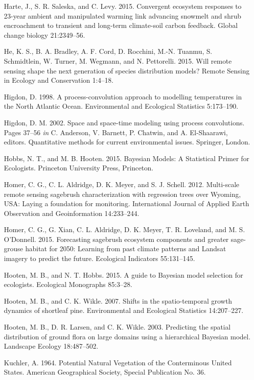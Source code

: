 \documentclass[12pt,]{article}
\begin{document}
Harte, J., S. R. Saleska, and C. Levy. 2015. Convergent ecosystem
responses to 23-year ambient and manipulated warming link advancing
snowmelt and shrub encroachment to transient and long-term climate-soil
carbon feedback. Global change biology 21:2349--56.

He, K. S., B. A. Bradley, A. F. Cord, D. Rocchini, M.-N. Tuanmu, S.
Schmidtlein, W. Turner, M. Wegmann, and N. Pettorelli. 2015. Will remote
sensing shape the next generation of species distribution models? Remote
Sensing in Ecology and Conservation 1:4--18.

Higdon, D. 1998. A process-convolution approach to modelling
temperatures in the North Atlantic Ocean. Environmental and Ecological
Statistics 5:173--190.

Higdon, D. M. 2002. Space and space-time modeling using process
convolutions. Pages 37--56 \emph{in} C. Anderson, V. Barnett, P.
Chatwin, and A. El-Shaarawi, editors. Quantitative methods for current
environmental issues. Springer, London.

Hobbs, N. T., and M. B. Hooten. 2015. Bayesian Models: A Statistical
Primer for Ecologists. Princeton University Press, Princeton.

Homer, C. G., C. L. Aldridge, D. K. Meyer, and S. J. Schell. 2012.
Multi-scale remote sensing sagebrush characterization with regression
trees over Wyoming, USA: Laying a foundation for monitoring.
International Journal of Applied Earth Observation and Geoinformation
14:233--244.

Homer, C. G., G. Xian, C. L. Aldridge, D. K. Meyer, T. R. Loveland, and
M. S. O'Donnell. 2015. Forecasting sagebrush ecosystem components and
greater sage-grouse habitat for 2050: Learning from past climate
patterns and Landsat imagery to predict the future. Ecological
Indicators 55:131--145.

Hooten, M. B., and N. T. Hobbs. 2015. A guide to Bayesian model
selection for ecologists. Ecological Monographs 85:3--28.

Hooten, M. B., and C. K. Wikle. 2007. Shifts in the spatio-temporal
growth dynamics of shortleaf pine. Environmental and Ecological
Statistics 14:207--227.

Hooten, M. B., D. R. Larsen, and C. K. Wikle. 2003. Predicting the
spatial distribution of ground flora on large domains using a
hierarchical Bayesian model. Landscape Ecology 18:487--502.

Kuchler, A. 1964. Potential Natural Vegetation of the Conterminous
United States. American Geographical Society, Special Publication No.
36.
\end{document}
